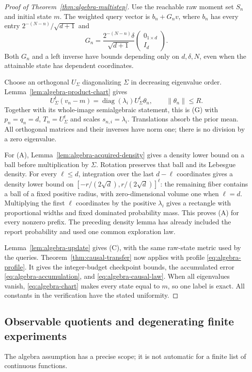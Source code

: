 \begin{proof}[Proof of Theorem~\ref{thm:algebra-multistep}]
Use the reachable raw moment set $S_n$ and initial state $m$.
The weighted query vector is $b_n+G_nv$, where $b_n$ has every entry
$2^{-(N-n)}/\sqrt{d+1}$ and
\[
 G_n=\frac{2^{-(N-n)}\delta}{\sqrt{d+1}}
                           \begin{pmatrix}0_{1\times d}\\ I_d\end{pmatrix}.
\]
Both $G_n$ and a left inverse have bounds depending only on
$d,\delta,N$, even when the attainable state has dependent coordinates.

Choose an orthogonal $U_\Sigma$ diagonalizing $\Sigma$ in decreasing
eigenvalue order. Lemma~\ref{lem:algebra-product-chart} gives
\[
 U_\Sigma^t(v_n-m)=\operatorname{diag}(\lambda_i)U_\Sigma^t\theta_n,
             \qquad\|\theta_n\|\le R.
\]
Together with its whole-image semialgebraic statement, this is (G) with
$p_n=q_n=d$, $T_n=U_\Sigma^t$ and scales $s_{n,i}=\lambda_i$.
Translations absorb the prior mean. All orthogonal matrices and their
inverses have norm one; there is no division by a zero eigenvalue.

For (A), Lemma~\ref{lem:algebra-acquired-density} gives a density lower
bound on a ball before multiplication by $\Sigma$. Rotation preserves
that ball and its Lebesgue density. For every $\ell\le d$, integration
over the last $d-\ell$ coordinates gives a density lower bound on
$[-r/(2\sqrt d),r/(2\sqrt d)]^\ell$: the remaining fiber contains
a ball of a fixed positive radius, with zero-dimensional volume one
when $\ell=d$. Multiplying the first $\ell$ coordinates by the
positive $\lambda_i$ gives a rectangle with proportional widths and
fixed dominated probability mass. This proves (A) for every nonzero
prefix. The preceding density lemma has already included the report
probability and used one common exploration law.

Lemma~\ref{lem:algebra-update} gives (C), with the same raw-state
metric used by the queries. Theorem~\ref{thm:causal-transfer} now applies
with profile \eqref{eq:algebra-profile}. It gives the integer-budget
checkpoint bounds, the accumulated error \eqref{eq:algebra-accumulation},
and \eqref{eq:algebra-causal-law}. When all eigenvalues vanish,
\eqref{eq:algebra-chart} makes every state equal to $m$, so one label
is exact. All constants in the verification have the stated uniformity.
\end{proof}

\subsection{Observable quotients and degenerating finite experiments}
The algebra assumption has a precise scope; it is not automatic for a
finite list of continuous functions.

